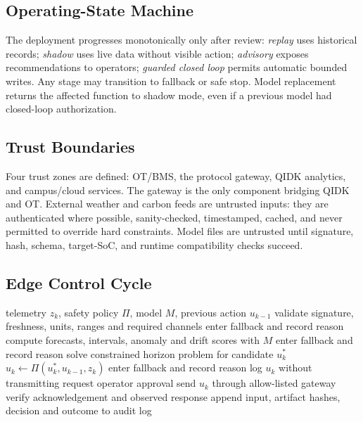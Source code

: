 \subsection{Operating-State Machine}

The deployment progresses monotonically only after review: \emph{replay} uses historical records; \emph{shadow} uses live data without visible action; \emph{advisory} exposes recommendations to operators; \emph{guarded closed loop} permits automatic bounded writes. Any stage may transition to fallback or safe stop. Model replacement returns the affected function to shadow mode, even if a previous model had closed-loop authorization.

\subsection{Trust Boundaries}

Four trust zones are defined: OT/BMS, the protocol gateway, QIDK analytics, and campus/cloud services. The gateway is the only component bridging QIDK and OT. External weather and carbon feeds are untrusted inputs: they are authenticated where possible, sanity-checked, timestamped, cached, and never permitted to override hard constraints. Model files are untrusted until signature, hash, schema, target-SoC, and runtime compatibility checks succeed.

\subsection{Edge Control Cycle}

\begin{algorithm}[t]
	\caption{Uncertainty-gated edge control cycle}
	\label{alg:control-cycle}
	\begin{algorithmic}[1]
		\Require telemetry $z_k$, safety policy $\Pi$, model $M$, previous action $u_{k-1}$
		\State validate signature, freshness, units, ranges and required channels
		\State enter fallback and record reason
		\Else
		\State compute forecasts, intervals, anomaly and drift scores with $M$
		\State enter fallback and record reason
		\Else
		\State solve constrained horizon problem for candidate $u_k^*$
		\State $u_k \gets \Pi(u_k^*,u_{k-1},z_k)$
		\State enter fallback and record reason
		\State log $u_k$ without transmitting
		\State request operator approval
		\Else
		\State send $u_k$ through allow-listed gateway
		\State verify acknowledgement and observed response
		\EndIf
		\EndIf
		\EndIf
		\State append input, artifact hashes, decision and outcome to audit log
	\end{algorithmic}
\end{algorithm}

